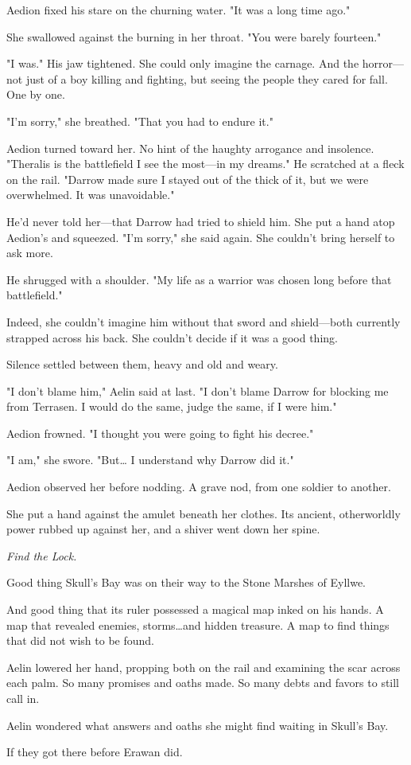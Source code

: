 Aedion fixed his stare on the churning water.
"It was a long time ago."

She swallowed against the burning in her throat.
"You were barely fourteen."

"I was."
His jaw tightened.
She could only imagine the carnage.
And the horror---not just of a boy killing and fighting, but seeing the people they cared for fall.
One by one.

"I'm sorry," she breathed.
"That you had to endure it."

Aedion turned toward her.
No hint of the haughty arrogance and insolence.
"Theralis is the battlefield I see the most---in my dreams."
He scratched at a fleck on the rail.
"Darrow made sure I stayed out of the thick of it, but we were overwhelmed.
It was unavoidable."

He'd never told her---that Darrow had tried to shield him.
She put a hand atop Aedion's and squeezed.
"I'm sorry," she said again.
She couldn't bring herself to ask more.

He shrugged with a shoulder.
"My life as a warrior was chosen long before that battlefield."

Indeed, she couldn't imagine him without that sword and shield---both currently strapped across his back.
She couldn't decide if it was a good thing.

Silence settled between them, heavy and old and weary.

"I don't blame him," Aelin said at last.
"I don't blame Darrow for blocking me from Terrasen.
I would do the same, judge the same, if I were him."

Aedion frowned.
"I thought you were going to fight his decree."

"I am," she swore.
"But\ldots{} I understand why Darrow did it."

Aedion observed her before nodding.
A grave nod, from one soldier to another.

She put a hand against the amulet beneath her clothes.
Its ancient, otherworldly power rubbed up against her, and a shiver went down her spine.

\emph{Find the Lock.}

Good thing Skull's Bay was on their way to the Stone Marshes of Eyllwe.

And good thing that its ruler possessed a magical map inked on his hands.
A map that revealed enemies, storms\ldots and hidden treasure.
A map to find things that did not wish to be found.

Aelin lowered her hand, propping both on the rail and examining the scar across each palm.
So many promises and oaths made.
So many debts and favors to still call in.

Aelin wondered what answers and oaths she might find waiting in Skull's Bay.

If they got there before Erawan did.
